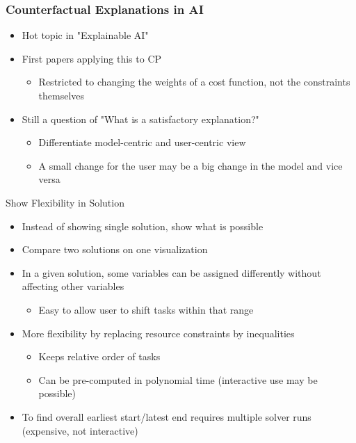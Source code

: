 \begin{frame}
\frametitle{Counterfactual Explanations in AI}
\begin{itemize}
\item Hot topic in "Explainable AI" \cite{DBLP:journals/access/StepinACP21,DBLP:journals/corr/abs-2010-10596}
\item First papers applying this to CP \cite{Korikov2021} \cite{DBLP:conf/ijcai/KorikovSB21}
\begin{itemize}
    \item Restricted to changing the weights of a cost function, not the constraints themselves
\end{itemize}
\item Still a question of "What is a satisfactory explanation?"
\begin{itemize}
    \item Differentiate model-centric and user-centric view
    \item A small change for the user may be a big change in the model and vice versa
\end{itemize}
\end{itemize}
\end{frame}

\begin{frame}{Show Flexibility in Solution}
\begin{itemize}
    \item Instead of showing single solution, show what is possible
    \item Compare two solutions on one visualization
    \item In a given solution, some variables can be assigned differently without affecting other variables
    \begin{itemize}
        \item Easy to allow user to shift tasks within that range
    \end{itemize}
    \item More flexibility by replacing resource constraints by inequalities
    \begin{itemize}
    \item Keeps relative order of tasks
    \item Can be pre-computed in polynomial time (interactive use may be possible)
    \end{itemize}
    \item To find overall earliest start/latest end requires multiple solver runs (expensive, not interactive)
\end{itemize}
\end{frame}

